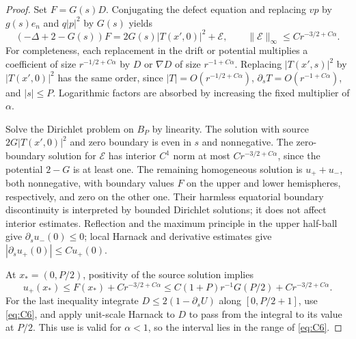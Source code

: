 \begin{proof}
Set $F=G(s)D$.  Conjugating the defect equation and replacing $vp$
by $g(s)e_n$ and $q|p|^2$ by $G(s)$ yields
\begin{equation}\label{eq:reach-ball-conjugation}
 (-\Delta+2-G(s))F
 =2G(s)|T(x',0)|^2+\mathcal E,
 \qquad\|\mathcal E\|_\infty\le Cr^{-3/2+C\alpha}.
\end{equation}
For completeness, each replacement in the drift or potential
multiplies a coefficient of size $r^{-1/2+C\alpha}$ by $D$ or
$\nabla D$ of size $r^{-1+C\alpha}$.  Replacing
$|T(x',s)|^2$ by $|T(x',0)|^2$ has the same order, since
$|T|=O(r^{-1/2+C\alpha})$, $\partial_sT=O(r^{-1+C\alpha})$,
and $|s|\le P$.  Logarithmic factors are absorbed by increasing
the fixed multiplier of $\alpha$.

Solve the Dirichlet problem on $B_P$ by linearity.  The solution
with source $2G|T(x',0)|^2$ and zero boundary is even in $s$ and
nonnegative.  The zero-boundary solution for $\mathcal E$ has
interior $C^1$ norm at most $Cr^{-3/2+C\alpha}$, since the potential
$2-G$ is at least one.  The remaining homogeneous solution is
$u_++u_-$, both nonnegative, with boundary values $F$ on the upper
and lower hemispheres, respectively, and zero on the other one.
Their harmless equatorial boundary discontinuity is interpreted by
bounded Dirichlet solutions; it does not affect interior estimates.
Reflection and the maximum principle in the upper half-ball give
$\partial_su_-(0)\le0$; local Harnack and derivative estimates give
$|\partial_su_+(0)|\le Cu_+(0)$.

At $x_*=(0,P/2)$, positivity of the source solution implies
\[
 u_+(x_*)\le F(x_*)+Cr^{-3/2+C\alpha}
 \le C(1+P)r^{-1}G(P/2)+Cr^{-3/2+C\alpha}.
\]
For the last inequality integrate $D\le2(1-\partial_sU)$ along
$[0,P/2+1]$, use \eqref{eq:C6}, and apply unit-scale Harnack to $D$
to pass from the integral to its value at $P/2$.  This use is valid
for $\alpha<1$, so the interval lies in the range of \eqref{eq:C6}.


\end{proof}
